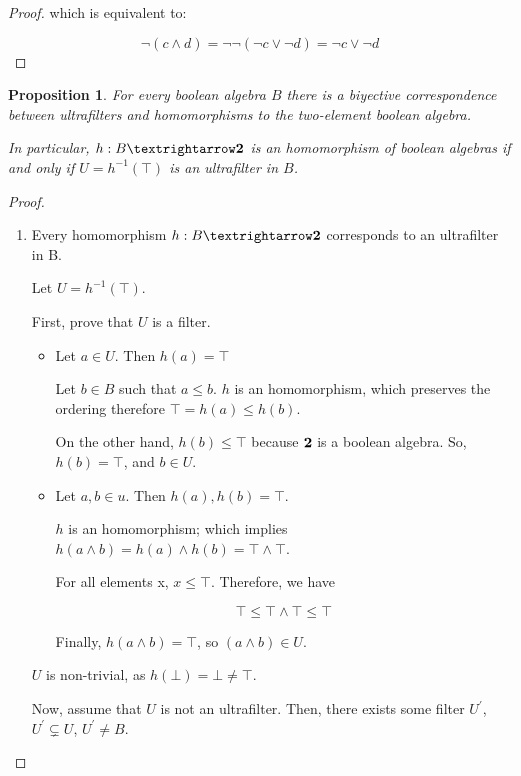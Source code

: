 \documentclass[notitlepage,a4paper]{article}
\newtheorem{proposition}{Proposition}
\begin{document}
\begin{enumerate}
\begin{proof}
       which is equivalent to:

       $$¬(c ∧ d) = ¬¬(¬c ∨ ¬d) = ¬c ∨ ¬d$$
   \end{proof}
     
   \begin{proposition}\label{prop:ex}
   For every boolean algebra $B$ there is a biyective correspondence
   between ultrafilters and homomorphisms to the two-element boolean
   algebra.

   In particular,  $h : B → \text{\bf 2}$ is an homomorphism of boolean algebras
   if and only if $U = h^{-1}(⊤)$ is an ultrafilter in $B$.
   
   \end{proposition}

   \begin{proof}
   \begin{enumerate}
     \item Every homomorphism $h : B → \text{\bf 2}$ corresponds to an
       ultrafilter in B.

       Let $U = h^{-1}(⊤)$.

       First, prove that $U$ is a filter.

       \begin{itemize}
         \item
           Let $a ∈ U$. Then $h(a) = ⊤$

           Let $b ∈ B$ such that $a ≤ b$. $h$ is an homomorphism, which
           preserves the ordering therefore $⊤ = h(a) ≤ h(b)$.

           On the other hand, $h(b) ≤ ⊤$ because $\text{\bf 2}$ is a
           boolean algebra. So, $h(b) = ⊤$, and $b ∈ U$.

         \item

           Let $a, b ∈ u$. Then $h(a), h(b) = ⊤$.

           $h$ is an homomorphism; which implies $h(a ∧ b) = h(a) ∧ h(b) = ⊤ ∧ ⊤$.

           For all elements x, $x ≤ ⊤$. Therefore, we have

           $$⊤ ≤ ⊤ ∧ ⊤ ≤ ⊤$$

           Finally, $h(a ∧ b) = ⊤$, so $(a ∧ b) ∈ U$.

      \end{itemize}

      $U$ is non-trivial, as $h(⊥) = ⊥ ≠ ⊤$.

      Now, assume that $U$ is not an ultrafilter. Then, there exists
      some filter $U^\prime$, $U^\prime \subsetneq U$, $U^\prime ≠ B$.
           

\end{enumerate}
\end{proof}
\end{enumerate}
\end{document}
